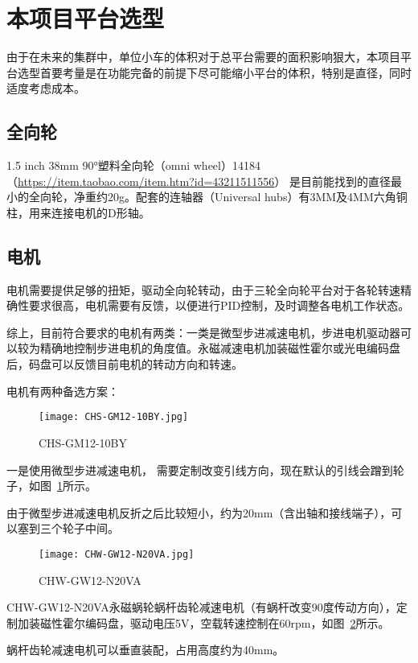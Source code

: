 \section{本项目平台选型}

由于在未来的集群中，单位小车的体积对于总平台需要的面积影响狠大，本项目平台选型首要考量是在功能完备的前提下尽可能缩小平台的体积，特别是直径，同时适度考虑成本。

\subsection{全向轮}

1.5 inch 38mm 90°塑料全向轮（omni wheel）14184 （\url{https://item.taobao.com/item.htm?id=43211511556}） 是目前能找到的直径最小的全向轮，净重约20g。配套的连轴器（Universal hubs）有3MM及4MM六角铜柱，用来连接电机的D形轴。

\subsection{电机}

电机需要提供足够的扭矩，驱动全向轮转动，由于三轮全向轮平台对于各轮转速精确性要求很高，电机需要有反馈，以便进行PID控制，及时调整各电机工作状态。

综上，目前符合要求的电机有两类：一类是微型步进减速电机，步进电机驱动器可以较为精确地控制步进电机的角度值。永磁减速电机加装磁性霍尔或光电编码盘后，码盘可以反馈目前电机的转动方向和转速。

电机有两种备选方案：

\begin{figure}[htbp]
    \centering
    \texttt{[image: CHS-GM12-10BY.jpg]}
    \caption{CHS-GM12-10BY}
    \label{fig:CHS-GM12-10BY}
\end{figure}


一是使用微型步进减速电机， 需要定制改变引线方向，现在默认的引线会蹭到轮子，如图~\ref{fig:CHS-GM12-10BY}所示。

由于微型步进减速电机反折之后比较短小，约为20mm（含出轴和接线端子），可以塞到三个轮子中间。

\begin{figure}[htbp]
    \centering
    \texttt{[image: CHW-GW12-N20VA.jpg]}
    \caption{CHW-GW12-N20VA}
    \label{fig:CHW-GW12-N20VA}
\end{figure}

CHW-GW12-N20VA永磁蜗轮蜗杆齿轮减速电机（有蜗杆改变90度传动方向），定制加装磁性霍尔编码盘，驱动电压5V，空载转速控制在60rpm，如图~\ref{fig:CHW-GW12-N20VA}所示。

蜗杆齿轮减速电机可以垂直装配，占用高度约为40mm。